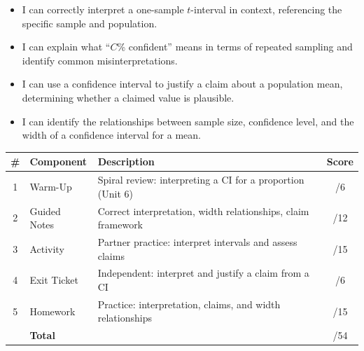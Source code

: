 \documentclass[10pt]{article}
\begin{document}

\vspace{2.4cm}
\namedateperiod

\begin{learningtargetbox}
\begin{itemize}
    \item I can correctly interpret a one-sample $t$-interval in context, referencing
          the specific sample and population.
    \item I can explain what ``$C$\% confident'' means in terms of repeated sampling and
          identify common misinterpretations.
    \item I can use a confidence interval to justify a claim about a population mean,
          determining whether a claimed value is plausible.
    \item I can identify the relationships between sample size, confidence level, and
          the width of a confidence interval for a mean.
\end{itemize}
\end{learningtargetbox}

\begin{tocbox}
\renewcommand{\arraystretch}{1.5}
\begin{tabularx}{\linewidth}{clXc}
    \textbf{\#} & \textbf{Component} & \textbf{Description} & \textbf{Score} \\
    \hline
    1 & Warm-Up      & Spiral review: interpreting a CI for a proportion (Unit 6)  & \hfill/6 \\
    2 & Guided Notes & Correct interpretation, width relationships, claim framework & \hfill/12 \\
    3 & Activity     & Partner practice: interpret intervals and assess claims       & \hfill/15 \\
    4 & Exit Ticket  & Independent: interpret and justify a claim from a CI         & \hfill/6 \\
    5 & Homework     & Practice: interpretation, claims, and width relationships    & \hfill/15 \\
    \hline
       & \multicolumn{2}{l}{\textbf{Total}} & \hfill/54 \\
\end{tabularx}
\end{tocbox}
\end{document}

